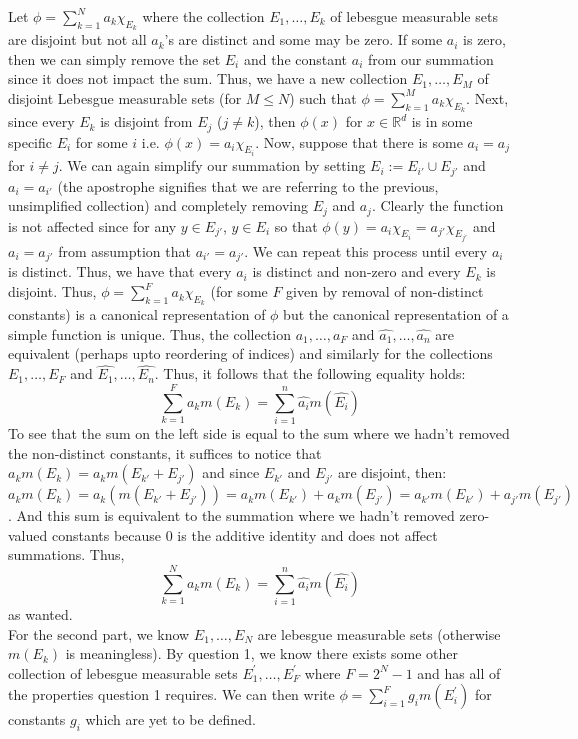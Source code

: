 \documentclass[12pt]{article}
\newcommand{\R}{\mathbb{R}}
\newenvironment{solution}[2][Solution]{\begin{trivlist}
\item[\hskip \labelsep {\bfseries #1}]}{\end{trivlist}}
\begin{document}
\begin{solution}
    sLet $\phi = \sum_{k=1}^N a_k\chi_{E_k}$ where the collection $E_1,\hdots,E_k$ of lebesgue measurable sets are disjoint but
    not all $a_k$'s are distinct and some may be zero. If some $a_i$ is zero, then we can simply remove the set $E_i$ and the constant
    $a_i$ from our summation since it does not impact the sum. Thus, we have a new collection $E_1,\hdots,E_M$ of disjoint Lebesgue
    measurable sets (for $M\leq N$) such that $\phi = \sum_{k=1}^M a_k\chi_{E_k}$. Next, since every $E_k$ is disjoint from $E_j$
    ($j\neq k$), then $\phi(x)$ for $x\in\R^d$ is in some specific $E_i$ for some $i$ i.e. $\phi(x) = a_i\chi_{E_i}$. Now, suppose
    that there is some $a_i = a_j$ for $i\neq j$. We can again simplify our summation by setting $E_i := E_{i'} \cup E_{j'}$ and
    $a_i = a_{i'}$
    (the apostrophe signifies that we are referring to the previous, unsimplified collection) and completely removing $E_j$ and $a_j$.
    Clearly the function is not affected since for any $y\in E_{j'}$, $y\in E_i$ so that $\phi(y) = a_i\chi_{E_i} = a_{j'}\chi_{E_{j'}}$
    and $a_i = a_{j'}$ from assumption that $a_{i'} = a_{j'}$. We can repeat this process until every $a_i$ is distinct. Thus,
    we have that every $a_i$ is distinct and non-zero and every $E_k$ is disjoint. Thus, $\phi = \sum_{k=1}^F a_k\chi_{E_k}$ (for
    some $F$ given by removal of non-distinct constants) is a canonical representation of $\phi$ but the canonical representation 
    of a simple function is unique. Thus, the collection $a_1,\hdots,a_F$ and $\hat{a_1},\hdots,\hat{a_n}$ are equivalent (perhaps
    upto reordering of indices) and similarly for the collections $E_1,\hdots,E_F$ and $\hat{E_1},\hdots,\hat{E_n}$. Thus, it follows
    that the following equality holds:
    \[ \sum_{k=1}^F a_km(E_k) = \sum_{i=1}^n \hat{a_i}m(\hat{E_i}) \]
    To see that the sum on the left side is equal to the sum where we hadn't removed the non-distinct constants, it suffices to
    notice that $a_k m(E_k) = a_k m(E_{k'} + E_{j'})$ and since $E_{k'}$ and $E_{j'}$ are disjoint, then: $a_km(E_k) =
    a_k(m(E_{k'} + E_{j'})) = a_km(E_{k'}) + a_km(E_{j'}) = a_{k'}m(E_{k'}) + a_{j'}m(E_{j'})$. And this sum is equivalent to the
    summation where we hadn't removed zero-valued constants because 0 is the additive identity and does not affect summations. Thus,
    \[ \sum_{k=1}^N a_km(E_k) = \sum_{i=1}^n \hat{a_i}m(\hat{E_i}) \]
    as wanted.\\

    For the second part, we know $E_1,\hdots, E_N$ are lebesgue measurable sets (otherwise $m(E_k)$ is meaningless). By question 1,
    we know there exists some other collection of lebesgue measurable sets $E_1^{'},\hdots,E_F^{'}$ where $F = 2^{N} -1$ and has all of
    the properties question 1 requires. We can then write $\phi = \sum_{i=1}^F g_i m(E_i^{'})$ for constants $g_i$ which are yet to
    be defined.\\


\end{solution}
\end{document}
